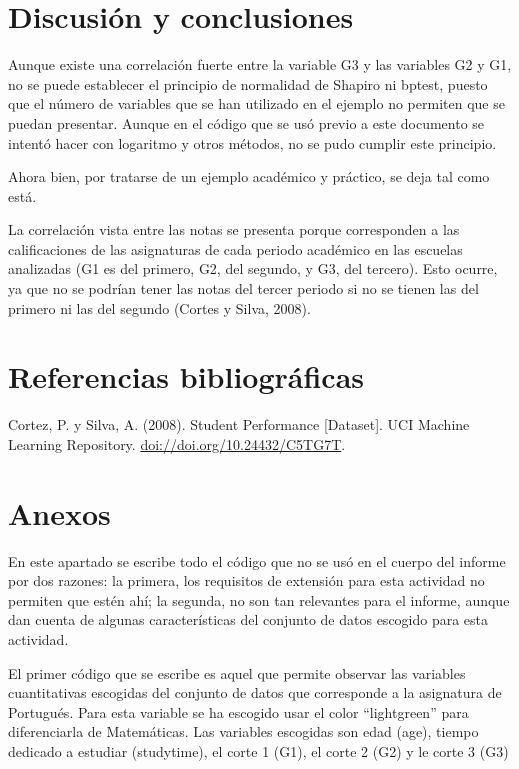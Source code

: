 \documentclass[
]{article}
\begin{document}
\section{Discusión y conclusiones}\label{discusiuxf3n-y-conclusiones}

Aunque existe una correlación fuerte entre la variable G3 y las
variables G2 y G1, no se puede establecer el principio de normalidad de
Shapiro ni bptest, puesto que el número de variables que se han
utilizado en el ejemplo no permiten que se puedan presentar. Aunque en
el código que se usó previo a este documento se intentó hacer con
logaritmo y otros métodos, no se pudo cumplir este principio.

Ahora bien, por tratarse de un ejemplo académico y práctico, se deja tal
como está.

La correlación vista entre las notas se presenta porque corresponden a
las calificaciones de las asignaturas de cada periodo académico en las
escuelas analizadas (G1 es del primero, G2, del segundo, y G3, del
tercero). Esto ocurre, ya que no se podrían tener las notas del tercer
periodo si no se tienen las del primero ni las del segundo (Cortes y
Silva, 2008).

\section{Referencias
bibliográficas}\label{referencias-bibliogruxe1ficas}

Cortez, P. y Silva, A. (2008). Student Performance {[}Dataset{]}. UCI
Machine Learning Repository. \url{doi://doi.org/10.24432/C5TG7T}.

\section{Anexos}\label{anexos}

En este apartado se escribe todo el código que no se usó en el cuerpo
del informe por dos razones: la primera, los requisitos de extensión
para esta actividad no permiten que estén ahí; la segunda, no son tan
relevantes para el informe, aunque dan cuenta de algunas características
del conjunto de datos escogido para esta actividad.

El primer código que se escribe es aquel que permite observar las
variables cuantitativas escogidas del conjunto de datos que corresponde
a la asignatura de Portugués. Para esta variable se ha escogido usar el
color ``lightgreen'' para diferenciarla de Matemáticas. Las variables
escogidas son edad (age), tiempo dedicado a estudiar (studytime), el
corte 1 (G1), el corte 2 (G2) y le corte 3 (G3)
\end{document}
